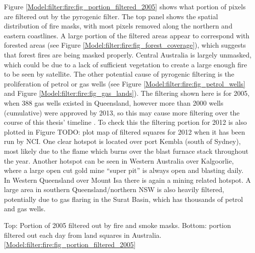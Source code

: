    Figure \ref{Model:filter:fire:fig_portion_filtered_2005} shows what portion of pixels are filtered out by the pyrogenic filter. 
    The top panel shows the spatial distribution of fire masks, with most pixels removed along the northern and eastern coastlines.
    A large portion of the filtered areas appear to correspond with forested areas (see Figure \ref{Model:filter:fire:fig_forest_coverage}), which suggests that forest fires are being masked properly.
    Central Australia is largely unmasked, which could be due to a lack of sufficient vegetation to create a large enough fire to be seen by satellite.
    The other potential cause of pyrogenic filtering is the proliferation of petrol or gas wells (see Figure \ref{Model:filter:fire:fig_petrol_wells} and Figure \ref{Model:filter:fire:fig_gas_lands}).
    The filtering shown here is for 2005, when 388 gas wells existed in Queensland, however more than 2000 wells (cumulative) were approved by 2013, so this may cause more filtering over the course of this thesis' timeline \parencite{Carlisle2012}.
    To check this the filtering portion for 2012 is also plotted in Figure TODO: plot map of filtered squares for 2012 when it has been run by NCI.
    One clear hotspot is located over port Kembla (south of Sydney), most likely due to the flame which burns over the blast furnace stack throughout the year.
    Another hotspot can be seen in Western Australia over Kalgoorlie, where a large open cut gold mine ``super pit'' is always open and blasting daily.
    In Western Queensland over Mount Isa there is again a mining related hotspot.
    A large area in southern Queensland/northern NSW is also heavily filtered, potentially due to gas flaring in the Surat Basin, which has thousands of petrol and gas wells.
    
    
    {Top: Portion of 2005 filtered out by fire and smoke masks. Bottom: portion filtered out each day from land squares in Australia.}{\ref{Model:filter:fire:fig_portion_filtered_2005}}
    
    
    
